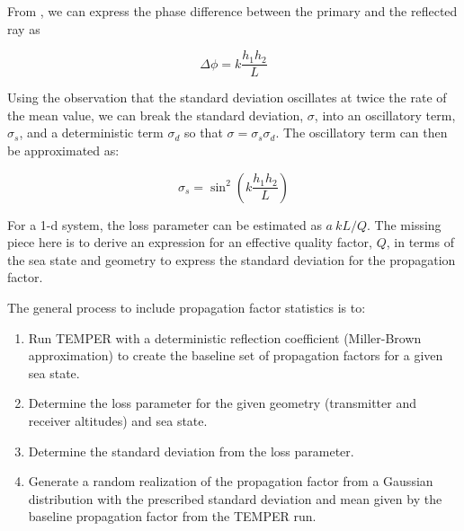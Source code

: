 From \cite{frazier_green}, we can express the phase difference between the primary and the reflected ray as

\begin{equation}
\Delta\phi = k\frac{h_1h_2}{L}
\end{equation}
\renewcommand{\baselinestretch}{2} \small\normalsize

Using the observation that the standard deviation oscillates at twice the rate of the mean value, we can break the standard deviation, $\sigma$, into an oscillatory term, $\sigma_s$, and a deterministic term $\sigma_d$ so that $\sigma = \sigma_s \sigma_d$. The oscillatory term can then be approximated as:

\begin{equation}
\sigma_s = \sin^2\left(k\frac{h_1h_2}{L}\right)
\end{equation}
\renewcommand{\baselinestretch}{2} \small\normalsize

For a 1-d system, the loss parameter can be estimated as $a ~ kL/Q$. The missing piece here is to derive an expression for an effective quality factor, $Q$, in terms of the sea state and geometry to express the standard deviation for the propagation factor.

The general process to include propagation factor statistics is to:
\begin{enumerate}
\item Run TEMPER with a deterministic reflection coefficient (Miller-Brown approximation) to create the baseline set of propagation factors for a given sea state.
\item Determine the loss parameter for the given geometry (transmitter and receiver altitudes) and sea state.
\item Determine the standard deviation from the loss parameter.
\item Generate a random realization of the propagation factor from a Gaussian distribution with the prescribed standard deviation and mean given by the baseline propagation factor from the TEMPER run.
\end{enumerate}